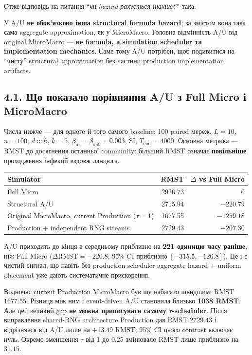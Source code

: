 \documentclass[11pt,a4paper]{article}
\begin{document}
Отже відповідь на питання ``\textit{чи hazard рахується інакше?}'' така:

\begin{tcolorbox}[colback=soft,colframe=macro,title=Коротка відповідь]
У A/U \textbf{не обов'язково інша structural formula hazard}; за змістом вона така сама aggregate approximation, як у MicroMacro. Головна відмінність A/U від original MicroMacro --- \textbf{не formula, а simulation scheduler та implementation mechanics}. Саме тому A/U потрібен, щоб подивитися на ``чисту'' structural approximation без частини production implementation artifacts.
\end{tcolorbox}

\subsection*{4.1. Що показало порівняння A/U з Full Micro і MicroMacro}

Числа нижче --- для одного й того самого baseline: 100 paired мереж, $L=10$, $n=100$, $d\approx6$, $k=5$, $\beta_{\mathrm{in}}=\beta_{\mathrm{out}}=0.003$, SI, $T_{\mathrm{end}}=4000$. Основна метрика --- RMST до досягнення останньої community: більший RMST означає \textbf{повільніше} проходження інфекції вздовж ланцюга.

\begin{center}
\begin{tabular}{l r r}
\toprule
\textbf{Simulator} & \textbf{RMST} & \textbf{$\Delta$ vs Full Micro}\\
\midrule
Full Micro & 2936.73 & 0\\
Structural A/U & 2715.94 & $-220.79$\\
Original MicroMacro, current Production ($\tau=1$) & 1677.55 & $-1259.18$\\
Production + independent RNG streams & 2729.43 & $-207.30$\\
\bottomrule
\end{tabular}
\end{center}

A/U приходить до кінця в середньому приблизно на \textbf{221 одиницю часу раніше}, ніж Full Micro ($\Delta\mathrm{RMST}=-220.8$; 95\% CI приблизно $[-315.5,-126.8]$). Це і є чистий сигнал, що навіть без production scheduler aggregate hazard + uniform placement уже дають систематичне прискорення.

Водночас current Production MicroMacro був ще набагато швидшим: RMST $1677.55$. Різниця між ним і event-driven A/U становила близько \textbf{1038 RMST}. Але цей великий gap \textbf{не можна приписувати самому $\tau$-scheduler}. Після виправлення shared-RNG architecture Production дав RMST $2729.43$ і відрізнявся від A/U лише на $+13.49$ RMST; 95\% CI цього contrast включає нуль. Окремо зменшення $\tau$ від $1$ до $0.25$ змінювало RMST лише приблизно на $31.15$.
\end{document}

